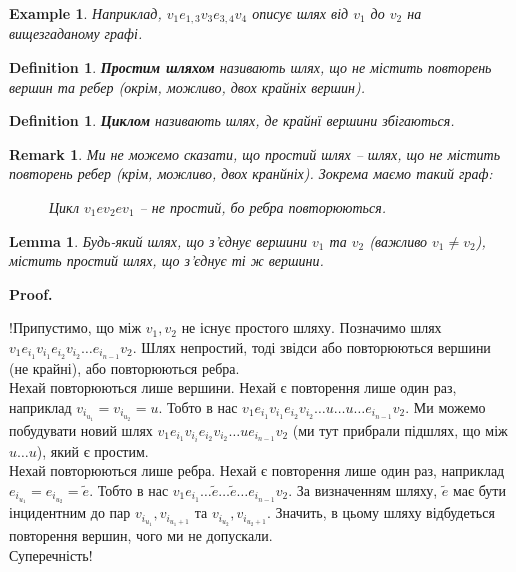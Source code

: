\documentclass[a4paper, 14pt]{extarticle}
\makeatletter
\theoremstyle{theoremdd}
\theoremstyle{theoremdd}
\newtheorem{definition}[theorem]{Definition}
\theoremstyle{theoremdd}
\theoremstyle{theoremdd}
\theoremstyle{theoremdd}
\newtheorem{example}[theorem]{Example}
\theoremstyle{theoremdd}
\theoremstyle{theoremdd}
\theoremstyle{theoremdd}
\theoremstyle{theoremdd}
\theoremstyle{theoremdd}
\theoremstyle{theoremdd}
\newtheorem{remark}[theorem]{Remark}
\theoremstyle{theoremdd}
\theoremstyle{theoremdd}
\newtheorem{lemma}[theorem]{Lemma}
\theoremstyle{theoremdd}
\theoremstyle{theoremdd}
\renewenvironment{proof}[1][Proof.\\]{\par
\pushQED{\hfill \qed}%
\normalfont \topsep6\p@\@plus6\p@\relax
\trivlist
\item\relax
{\bfseries
#1\@addpunct{.}}\hspace\labelsep\ignorespaces
}{%
\popQED\endtrivlist\@endpefalse
}
\makeatother
\begin{document}
\begin{example}
Наприклад, $v_1 e_{1,3} v_3 e_{3,4} v_4$ описує шлях від $v_1$ до $v_2$ на вищезгаданому графі.
\end{example}

\begin{definition}
\textbf{Простим шляхом} називають шлях, що не містить повторень вершин та ребер (окрім, можливо, двох крайніх вершин).
\end{definition}

\begin{definition}
\textbf{Циклом} називають шлях, де крайнї вершини збігаються.
\end{definition}

\begin{remark}
Ми не можемо сказати, що простий шлях -- шлях, що не містить повторень ребер (крім, можливо, двох кранйніх). Зокрема маємо такий граф:
\begin{figure}[H]
\centering
{}
\caption*{Цикл $v_1ev_2ev_1$ -- не простий, бо ребра повторюються.}
\end{figure}
\end{remark}

\begin{lemma}
Будь-який шлях, що з'єднує вершини $v_1$ та $v_2$ (важливо $v_1 \neq v_2$), містить простий шлях, що з'єднує ті ж вершини.
\end{lemma}

\begin{proof}
!Припустимо, що між $v_1,v_2$ не існує простого шляху. Позначимо шлях $v_1e_{i_1}v_{i_1}e_{i_2}v_{i_2} \dots e_{i_{n-1}}v_2$. Шлях непростий, тоді звідси або повторюються вершини (не крайні), або повторюються ребра.\\
Нехай повторюються лише вершини. Нехай є повторення лише один раз, наприклад $v_{i_{u_1}} = v_{i_{u_2}} = u$. Тобто в нас $v_1e_{i_1}v_{i_1}e_{i_2}v_{i_2} \dots u \dots u \dots  e_{i_{n-1}}v_2$. Ми можемо побудувати новий шлях $v_1e_{i_1}v_{i_i}e_{i_2}v_{i_2} \dots u e_{i_{n-1}}v_2$ (ми тут прибрали підшлях, що між $u \dots u$), який є простим.\\
Нехай повторюються лише ребра. Нехай є повторення лише один раз, наприклад $e_{i_{u_1}} = e_{i_{u_2}} = \tilde{e}$. Тобто в нас $v_1 e_{i_1} \dots \tilde{e} \dots \tilde{e} \dots e_{i_{n-1}}v_2$. За визначенням шляху, $\tilde{e}$ має бути інцидентним до пар $v_{i_{u_1}}, v_{i_{u_1+1}}$ та $v_{i_{u_2}}, v_{i_{u_2+1}}$. Значить, в цьому шляху відбудеться повторення вершин, чого ми не допускали.\\
Суперечність!
\end{proof}
\end{document}
